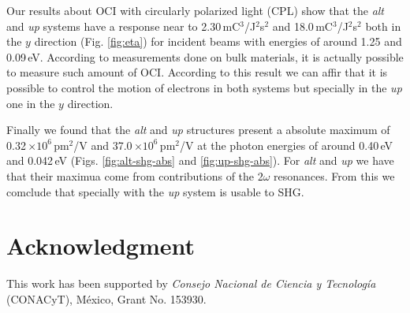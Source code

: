 \documentclass[pss]{wiley2sp} %
\begin{document}
Our results about OCI with circularly polarized light (CPL) show that the \emph{alt}  and \emph{up} systems have a response near to 2.30\,mC$^{3}$/J$^{2}$s$^{2}$ and 18.0\,mC$^{3}$/J$^{2}$s$^{2}$ both in the $y$ direction (Fig. \ref{fig:eta}) for incident beams with energies of around 1.25 and 0.09\,eV. According to measurements done on bulk materials, it is actually possible to measure such amount of OCI. According to this result we can affir that it is possible to control the motion of electrons in both systems but specially in the \emph{up} one in the $y$ direction.

Finally we found that the \emph{alt} and \emph{up} structures present a absolute maximum of 0.32\,$\times10^{6} $\,pm$^{2}$/V and 37.0\,$\times10^{6} $\,pm$^{2}$/V at the photon energies of around 0.40\,eV and 0.042\,eV (Figs. \ref{fig:alt-shg-abs} and \ref{fig:up-shg-abs}). For \emph{alt} and \emph{up} we have that their maximua come from contributions of the 2$\omega$ resonances. From this we comclude that specially with the \emph{up} system is usable to SHG.


\section{Acknowledgment} %

This work has been supported by \emph{Consejo Nacional de Ciencia y
Tecnolog\'ia} (CONACyT), M\'exico, Grant No. 153930.




\end{document}

